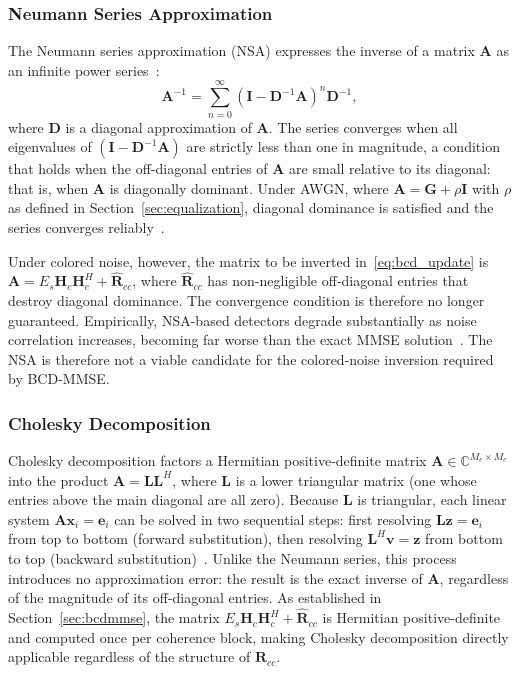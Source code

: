 \documentclass[12pt]{article}
\begin{document}
\subsubsection{Neumann Series Approximation}

The Neumann series approximation (NSA) expresses the inverse of a matrix
$\mathbf{A}$ as an infinite power series~\cite{wang2023bdnsepa}:
%
\begin{equation}
  \mathbf{A}^{-1} = \sum_{n=0}^{\infty}
  \left(\mathbf{I} - \mathbf{D}^{-1}\mathbf{A}\right)^n \mathbf{D}^{-1},
  \label{eq:neumann}
\end{equation}
%
where $\mathbf{D}$ is a diagonal approximation of $\mathbf{A}$.
The series converges when all eigenvalues of
$\left(\mathbf{I} - \mathbf{D}^{-1}\mathbf{A}\right)$ are strictly less
than one in magnitude, a condition that holds when the off-diagonal entries
of $\mathbf{A}$ are small relative to its diagonal: that is, when
$\mathbf{A}$ is diagonally dominant. Under AWGN, where
$\mathbf{A} = \mathbf{G} + \rho \mathbf{I}$ with $\rho$ as defined in Section~\ref{sec:equalization}, diagonal dominance is satisfied and the
series converges reliably~\cite{wang2023bdnsepa}.

Under colored noise, however, the matrix to be inverted
in~\eqref{eq:bcd_update} is
$\mathbf{A} = E_s\mathbf{H}_c\mathbf{H}_c^H + \hat{\mathbf{R}}_{cc}$,
where $\hat{\mathbf{R}}_{cc}$ has non-negligible off-diagonal entries that
destroy diagonal dominance. The convergence condition is therefore no
longer guaranteed. Empirically, NSA-based detectors degrade substantially
as noise correlation increases, becoming far worse than the exact MMSE
solution~\cite{wang2023bdnsepa}. The NSA is therefore not a viable
candidate for the colored-noise inversion required by BCD-MMSE.

\subsubsection{Cholesky Decomposition}
Cholesky decomposition factors a Hermitian positive-definite matrix
$\mathbf{A} \in \mathbb{C}^{M_c \times M_c}$ into the product
$\mathbf{A} = \mathbf{L}\mathbf{L}^H$, where $\mathbf{L}$ is a lower
triangular matrix (one whose entries above the main diagonal are all
zero). Because $\mathbf{L}$ is triangular, each linear system
$\mathbf{A}\mathbf{x}_i = \mathbf{e}_i$ can be solved in two sequential
steps: first resolving $\mathbf{L}\mathbf{z} = \mathbf{e}_i$ from top to
bottom (forward substitution), then resolving $\mathbf{L}^H\mathbf{v} =
\mathbf{z}$ from bottom to top (backward substitution)~\cite{li-tradeofs}.
Unlike the Neumann series, this process introduces no approximation error:
the result is the exact inverse of $\mathbf{A}$, regardless of the
magnitude of its off-diagonal entries. As established in
Section~\ref{sec:bcdmmse}, the matrix $E_s\mathbf{H}_c\mathbf{H}_c^H +
\hat{\mathbf{R}}_{cc}$ is Hermitian positive-definite and computed once per
coherence block, making Cholesky decomposition directly applicable
regardless of the structure of $\hat{\mathbf{R}}_{cc}$.
\end{document}
